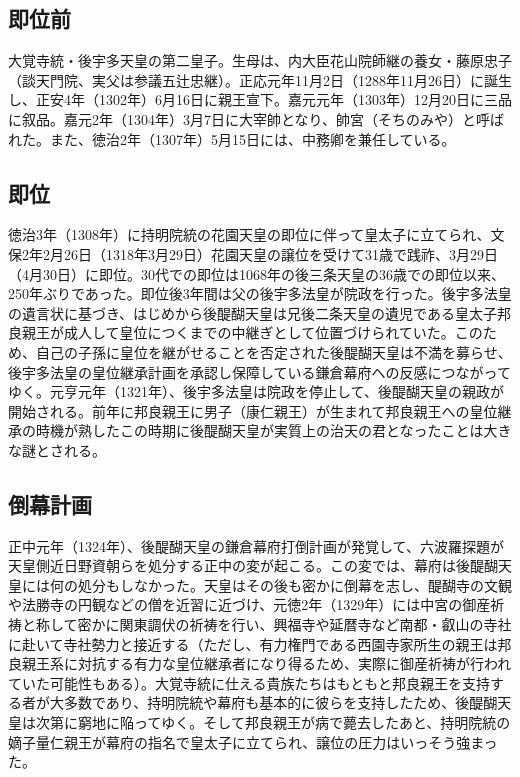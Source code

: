 \documentclass[twocolumn]{jsarticle}
\begin{document}
\subsection{即位前}

大覚寺統・後宇多天皇の第二皇子。生母は、内大臣花山院師継の養女・藤原忠子（談天門院、実父は参議五辻忠継）。正応元年11月2日（1288年11月26日）に誕生し、正安4年（1302年）6月16日に親王宣下。嘉元元年（1303年）12月20日に三品に叙品。嘉元2年（1304年）3月7日に大宰帥となり、帥宮（そちのみや）と呼ばれた。また、徳治2年（1307年）5月15日には、中務卿を兼任している。

\subsection{即位}

徳治3年（1308年）に持明院統の花園天皇の即位に伴って皇太子に立てられ、文保2年2月26日（1318年3月29日）花園天皇の譲位を受けて31歳で践祚、3月29日（4月30日）に即位。30代での即位は1068年の後三条天皇の36歳での即位以来、250年ぶりであった。即位後3年間は父の後宇多法皇が院政を行った。後宇多法皇の遺言状に基づき、はじめから後醍醐天皇は兄後二条天皇の遺児である皇太子邦良親王が成人して皇位につくまでの中継ぎとして位置づけられていた。このため、自己の子孫に皇位を継がせることを否定された後醍醐天皇は不満を募らせ、後宇多法皇の皇位継承計画を承認し保障している鎌倉幕府への反感につながってゆく。元亨元年（1321年）、後宇多法皇は院政を停止して、後醍醐天皇の親政が開始される。前年に邦良親王に男子（康仁親王）が生まれて邦良親王への皇位継承の時機が熟したこの時期に後醍醐天皇が実質上の治天の君となったことは大きな謎とされる。

\subsection{倒幕計画}

正中元年（1324年）、後醍醐天皇の鎌倉幕府打倒計画が発覚して、六波羅探題が天皇側近日野資朝らを処分する正中の変が起こる。この変では、幕府は後醍醐天皇には何の処分もしなかった。天皇はその後も密かに倒幕を志し、醍醐寺の文観や法勝寺の円観などの僧を近習に近づけ、元徳2年（1329年）には中宮の御産祈祷と称して密かに関東調伏の祈祷を行い、興福寺や延暦寺など南都・叡山の寺社に赴いて寺社勢力と接近する（ただし、有力権門である西園寺家所生の親王は邦良親王系に対抗する有力な皇位継承者になり得るため、実際に御産祈祷が行われていた可能性もある）。大覚寺統に仕える貴族たちはもともと邦良親王を支持する者が大多数であり、持明院統や幕府も基本的に彼らを支持したため、後醍醐天皇は次第に窮地に陥ってゆく。そして邦良親王が病で薨去したあと、持明院統の嫡子量仁親王が幕府の指名で皇太子に立てられ、譲位の圧力はいっそう強まった。
\end{document}
